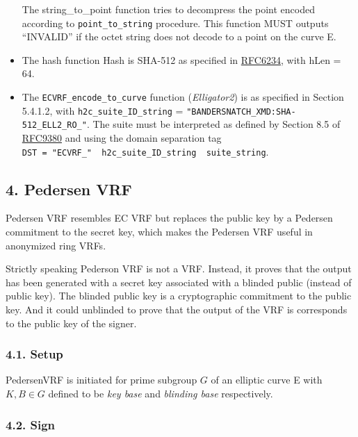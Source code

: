 \documentclass[
]{article}
\begin{document}
\begin{itemize}
  The string\_to\_point function tries to decompress the point encoded
  according to \texttt{point\_to\_string} procedure. This function MUST
  outputs ``INVALID'' if the octet string does not decode to a point on
  the curve E.
\item
  The hash function Hash is SHA-512 as specified in
  \href{https://www.rfc-editor.org/rfc/rfc6234}{RFC6234}, with hLen =
  64.
\item
  The \texttt{ECVRF\_encode\_to\_curve} function (\emph{Elligator2}) is
  as specified in Section 5.4.1.2, with \texttt{h2c\_suite\_ID\_string}
  = \texttt{"BANDERSNATCH\_XMD:SHA-512\_ELL2\_RO\_"}. The suite must be
  interpreted as defined by Section 8.5 of
  \href{https://datatracker.ietf.org/doc/rfc9380/}{RFC9380} and using
  the domain separation tag
  \texttt{DST\ =\ "ECVRF\_"\ \textbar{}\textbar{}\ h2c\_suite\_ID\_string\ \textbar{}\textbar{}\ suite\_string}.
\end{itemize}

\hypertarget{pedersen-vrf}{%
\subsection{4. Pedersen VRF}\label{pedersen-vrf}}

Pedersen VRF resembles EC VRF but replaces the public key by a Pedersen
commitment to the secret key, which makes the Pedersen VRF useful in
anonymized ring VRFs.

Strictly speaking Pederson VRF is not a VRF. Instead, it proves that the
output has been generated with a secret key associated with a blinded
public (instead of public key). The blinded public key is a
cryptographic commitment to the public key. And it could unblinded to
prove that the output of the VRF is corresponds to the public key of the
signer.

\hypertarget{setup-1}{%
\subsubsection{4.1. Setup}\label{setup-1}}

PedersenVRF is initiated for prime subgroup \(G\) of an elliptic curve E
with \(K, B \in G\) defined to be \emph{key base} and \emph{blinding
base} respectively.

\hypertarget{sign-1}{%
\subsubsection{4.2. Sign}\label{sign-1}}
\end{document}
